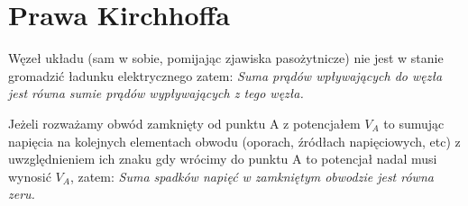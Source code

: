 \section{Prawa Kirchhoffa}
Węzeł układu (sam w sobie, pomijając zjawiska pasożytnicze) nie jest w stanie gromadzić ładunku elektrycznego zatem: \emph{Suma prądów wpływających do węzła jest równa sumie prądów wypływających z tego węzła.}

Jeżeli rozważamy obwód zamknięty od punktu A z potencjałem $V_A$ to sumując napięcia na kolejnych elementach obwodu (oporach, źródłach napięciowych, etc) z uwzględnieniem ich znaku gdy wrócimy do punktu A to potencjał nadal musi wynosić $V_A$, zatem: \emph{Suma spadków napięć w zamkniętym obwodzie jest równa zeru.}
